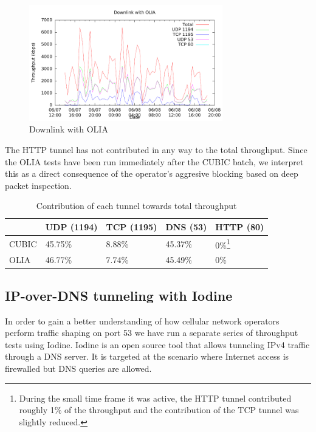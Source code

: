 \begin{figure}[H]
  \centering
  \includegraphics[width=0.75\textwidth]{img/down-olia}
  \caption{Downlink with OLIA}
  \label{fig:down-olia}
\end{figure}

The HTTP tunnel has not contributed in any way to the total throughput. Since
the OLIA tests have been run immediately after the CUBIC batch, we interpret
this as a direct consequence of the operator's aggresive blocking based on
deep packet inspection.
\begin{savenotes}
\begin{center}
	\begin{table}[htb]
	\centering
	\begin{tabular}{ | l | l | l | l | l | }
	\hline
	& UDP (1194) & TCP (1195) & DNS (53) & HTTP (80) \\ \hline
	CUBIC & 45.75\% & 8.88\% &  45.37\% & 0\%\footnote{During the small time frame it was active, the HTTP tunnel contributed roughly 1\% of the throughput and the contribution of the TCP tunnel was slightly reduced.} \\ \hline
	OLIA & 46.77\% & 7.74\% & 45.49\% & 0\% \\ \hline
	\end{tabular}
	\caption{Contribution of each tunnel towards total throughput}
	\label{table:iodine}
	\end{table}
\end{center}
\end{savenotes}

\subsection{IP-over-DNS tunneling with Iodine}

In order to gain a better understanding of how cellular network operators
perform traffic shaping on port 53 we have run a separate series of throughput
tests using Iodine. Iodine is an open source tool that allows tunneling IPv4
traffic through a DNS server. It is targeted at the scenario where Internet access is firewalled but DNS queries are allowed.

